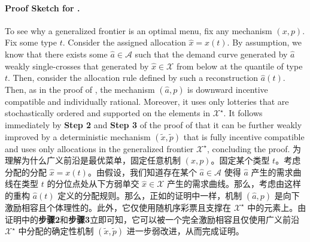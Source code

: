 \documentclass[12pt,letterpaper]{article}
\newenvironment{original}{\color{black}\noindent}{}
\newenvironment{translation}{\color{blue}\noindent}{}
\theoremstyle{plain}
\theoremstyle{definition}
\theoremstyle{remark}
\renewcommand{\1}{\mathds{1}}
\newcommand{\X}{\mathcal{X}}
\theoremstyle{definition}
\begin{document}
\paragraph{Proof Sketch for .}\hspace{-2mm}\begin{original}To see why a generalized frontier is an optimal menu, fix any mechanism $(x, p)$. Fix some type $t$. Consider the assigned allocation $\hat{x} = x(t)$. By assumption, we know that there exists some $\hat{a} \in \mathcal{A}$ such that the demand curve generated by $\hat{a}$ weakly single-crosses that generated by $\hat{x} \in \X$ from below at the quantile of type $t$. Then, consider the allocation rule defined by such a reconstruction $\hat{a}(t)$. Then, as in the proof of , the mechanism $(\hat{a}, p)$ is downward incentive compatible and individually rational. Moreover, it uses only lotteries that are stochastically ordered and supported on the elements in $\X^\star$. It follows immediately by \textbf{Step 2} and \textbf{Step 3} of the proof of  that it can be further weakly improved by a deterministic mechanism $(\tilde{x}, \tilde{p})$ that is fully incentive compatible and uses only allocations in the generalized frontier $\X^\star$, concluding the proof.
\end{original}
\begin{translation}
为理解为什么广义前沿是最优菜单，固定任意机制 $(x, p)$。固定某个类型 $t$。考虑分配的分配 $\hat{x} = x(t)$。由假设，我们知道存在某个 $\hat{a} \in \mathcal{A}$ 使得 $\hat{a}$ 产生的需求曲线在类型 $t$ 的分位点处从下方弱单交 $\hat{x} \in \X$ 产生的需求曲线。那么，考虑由这样的重构 $\hat{a}(t)$ 定义的分配规则。那么，正如的证明中一样，机制 $(\hat{a}, p)$ 是向下激励相容且个体理性的。此外，它仅使用随机序彩票且支撑在 $\X^\star$ 中的元素上。由证明中的\textbf{步骤2}和\textbf{步骤3}立即可知，它可以被一个完全激励相容且仅使用广义前沿 $\X^\star$ 中分配的确定性机制 $(\tilde{x}, \tilde{p})$ 进一步弱改进，从而完成证明。
\end{translation}
\end{document}
